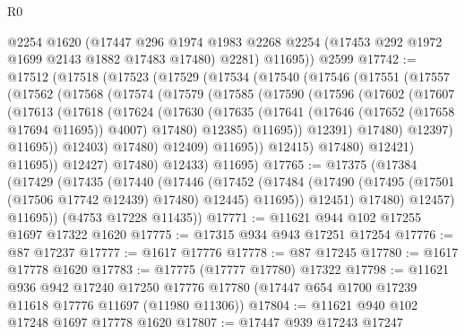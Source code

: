 \begin{lexlean}{R0}
\begin{coremodule}
        @2254
        @1620
        (@17447
          @296
          @1974
          @1983
          @2268
          @2254
          (@17453 @292 @1972 @1699 @2143 @1882 @17483 @17480)
          @2281)
        @11695))
    @2599
@17742 := @17512
    (@17518
      (@17523
        (@17529
          (@17534
            (@17540
              (@17546
                (@17551
                  (@17557
                    (@17562
                      (@17568
                        (@17574
                          (@17579
                            (@17585
                              (@17590
                                (@17596
                                  (@17602
                                    (@17607
                                      (@17613
                                        (@17618
                                          (@17624
                                            (@17630
                                              (@17635
                                                (@17641
                                                  (@17646 (@17652 (@17658 @17694 @11695)) @4007)
                                                  @17480)
                                                @12385)
                                              @11695))
                                          @12391)
                                        @17480)
                                      @12397)
                                    @11695))
                                @12403)
                              @17480)
                            @12409)
                          @11695))
                      @12415)
                    @17480)
                  @12421)
                @11695))
            @12427)
          @17480)
        @12433)
      @11695)
@17765 := @17375
    (@17384
      (@17429
        (@17435
          (@17440
            (@17446
              (@17452
                (@17484 (@17490 (@17495 (@17501 (@17506 @17742 @12439) @17480) @12445) @11695))
                @12451)
              @17480)
            @12457)
          @11695))
      (@4753 @17228 @11435))
@17771 := @11621 @944 @102 @17255 @1697 @17322 @1620
@17775 := @17315 @934 @943 @17251 @17254
@17776 := @87 @17237
@17777 := @1617 @17776
@17778 := @87 @17245
@17780 := @1617 @17778 @1620
@17783 := @17775 (@17777 @17780) @17322
@17798 := @11621
    @936
    @942
    @17240
    @17250
    @17776
    @17780
    (@17447 @654 @1700 @17239 @11618 @17776 @11697 (@11980 @11306))
@17804 := @11621 @940 @102 @17248 @1697 @17778 @1620
@17807 := @17447 @939 @17243 @17247

\end{coremodule}
\end{lexlean}

